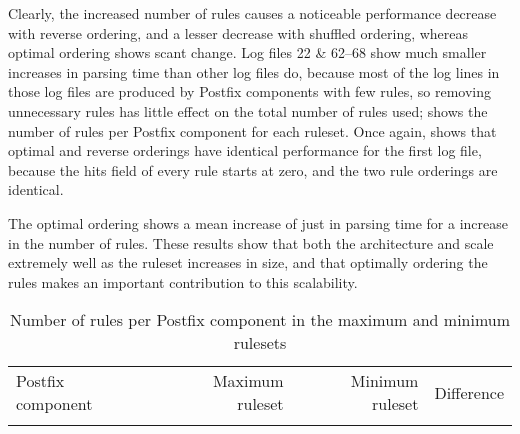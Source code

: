Clearly, the increased number of rules causes a noticeable performance
decrease with reverse ordering, and a lesser decrease with shuffled
ordering, whereas optimal ordering shows scant change.  Log files 22 \&
62--68 show much smaller increases in parsing time than other log files do,
because most of the log lines in those log files are produced by Postfix
components with few rules, so removing unnecessary rules has little effect
on the total number of rules used;  shows the number of rules
per Postfix component for each ruleset.  Once again,  shows that optimal and reverse orderings have identical
performance for the first log file, because the hits field of every rule
starts at zero, and the two rule orderings are identical.

The optimal ordering shows a mean increase of just
 in parsing time
for a \numberOFrulesMAXIMUMpercentage{} increase in the number of rules.
These results show that both the architecture and \parsername{} scale
extremely well as the ruleset increases in size, and that optimally
ordering the rules makes an important contribution to this scalability.



\begin{table}[thbp]
    \caption{Number of rules per Postfix component in the maximum and
    minimum rulesets}
    \empty{}\label{Number of rules per Postfix component in the maximum and
    minimum rulesets}
    \centering{}
    \begin{tabular}{lrrr}
        \tabletopline{}%
        Postfix component & Maximum ruleset & Minimum ruleset & Difference \\
        \tablemiddleline{}%
        
        \tablebottomline{}%
    \end{tabular}
\end{table}

